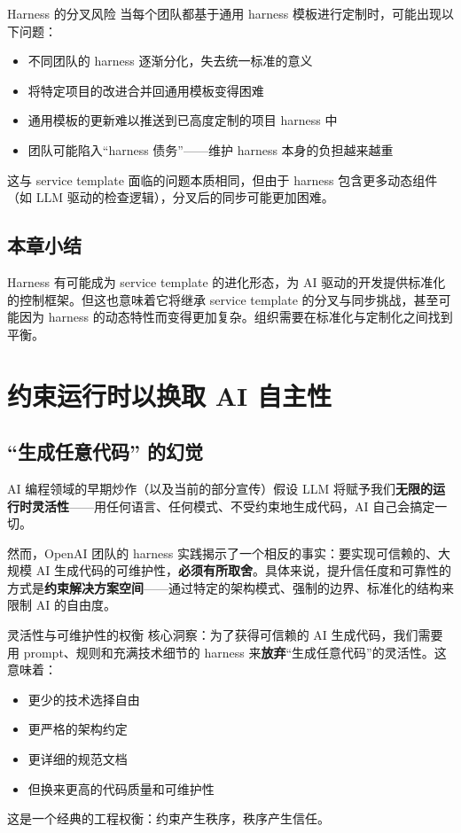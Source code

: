 \documentclass[a4paper]{article}
\begin{document}
\begin{warningbox}{Harness 的分叉风险}
当每个团队都基于通用 harness 模板进行定制时，可能出现以下问题：
\begin{itemize}[leftmargin=1.5em]
    \item 不同团队的 harness 逐渐分化，失去统一标准的意义
    \item 将特定项目的改进合并回通用模板变得困难
    \item 通用模板的更新难以推送到已高度定制的项目 harness 中
    \item 团队可能陷入``harness 债务''------维护 harness 本身的负担越来越重
\end{itemize}
这与 service template 面临的问题本质相同，但由于 harness 包含更多动态组件（如 LLM 驱动的检查逻辑），分叉后的同步可能更加困难。
\end{warningbox}

\subsection{本章小结}

Harness 有可能成为 service template 的进化形态，为 AI 驱动的开发提供标准化的控制框架。但这也意味着它将继承 service template 的分叉与同步挑战，甚至可能因为 harness 的动态特性而变得更加复杂。组织需要在标准化与定制化之间找到平衡。

\newpage

\section{约束运行时以换取 AI 自主性}

\subsection{``生成任意代码'' 的幻觉}

AI 编程领域的早期炒作（以及当前的部分宣传）假设 LLM 将赋予我们\textbf{无限的运行时灵活性}------用任何语言、任何模式、不受约束地生成代码，AI 自己会搞定一切。

然而，OpenAI 团队的 harness 实践揭示了一个相反的事实：要实现可信赖的、大规模 AI 生成代码的可维护性，\textbf{必须有所取舍}。具体来说，提升信任度和可靠性的方式是\textbf{约束解决方案空间}------通过特定的架构模式、强制的边界、标准化的结构来限制 AI 的自由度。

\begin{importantbox}{灵活性与可维护性的权衡}
核心洞察：为了获得可信赖的 AI 生成代码，我们需要用 prompt、规则和充满技术细节的 harness 来\textbf{放弃}``生成任意代码''的灵活性。这意味着：
\begin{itemize}[leftmargin=1.5em]
    \item 更少的技术选择自由
    \item 更严格的架构约定
    \item 更详细的规范文档
    \item 但换来更高的代码质量和可维护性
\end{itemize}
这是一个经典的工程权衡：约束产生秩序，秩序产生信任。
\end{importantbox}
\end{document}

